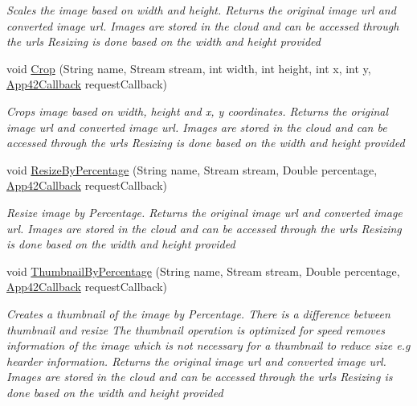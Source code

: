 \begin{DoxyCompactItemize}
\begin{DoxyCompactList}\small\item\em Scales the image based on width and height. Returns the original image url and converted image url. Images are stored in the cloud and can be accessed through the urls Resizing is done based on the width and height provided \end{DoxyCompactList}\item 
void \hyperlink{classcom_1_1shephertz_1_1app42_1_1paas_1_1sdk_1_1windows_1_1image_processor_1_1_image_processor_service_a21ddd1fbea12547f2e8fd2c2e7509b6a}{Crop} (String name, Stream stream, int width, int height, int x, int y, \hyperlink{interfacecom_1_1shephertz_1_1app42_1_1paas_1_1sdk_1_1windows_1_1_app42_callback}{App42\+Callback} request\+Callback)
\begin{DoxyCompactList}\small\item\em Crops image based on width, height and x, y coordinates. Returns the original image url and converted image url. Images are stored in the cloud and can be accessed through the urls Resizing is done based on the width and height provided \end{DoxyCompactList}\item 
void \hyperlink{classcom_1_1shephertz_1_1app42_1_1paas_1_1sdk_1_1windows_1_1image_processor_1_1_image_processor_service_a5bb2c643de3bd3c099e02720f6de426e}{Resize\+By\+Percentage} (String name, Stream stream, Double percentage, \hyperlink{interfacecom_1_1shephertz_1_1app42_1_1paas_1_1sdk_1_1windows_1_1_app42_callback}{App42\+Callback} request\+Callback)
\begin{DoxyCompactList}\small\item\em Resize image by Percentage. Returns the original image url and converted image url. Images are stored in the cloud and can be accessed through the urls Resizing is done based on the width and height provided \end{DoxyCompactList}\item 
void \hyperlink{classcom_1_1shephertz_1_1app42_1_1paas_1_1sdk_1_1windows_1_1image_processor_1_1_image_processor_service_a2dd5e7b9bc287e2cc24f41d9e1a753c8}{Thumbnail\+By\+Percentage} (String name, Stream stream, Double percentage, \hyperlink{interfacecom_1_1shephertz_1_1app42_1_1paas_1_1sdk_1_1windows_1_1_app42_callback}{App42\+Callback} request\+Callback)
\begin{DoxyCompactList}\small\item\em Creates a thumbnail of the image by Percentage. There is a difference between thumbnail and resize The thumbnail operation is optimized for speed removes information of the image which is not necessary for a thumbnail to reduce size e.\+g hearder information. Returns the original image url and converted image url. Images are stored in the cloud and can be accessed through the urls Resizing is done based on the width and height provided \end{DoxyCompactList}\item 

\end{DoxyCompactItemize}
